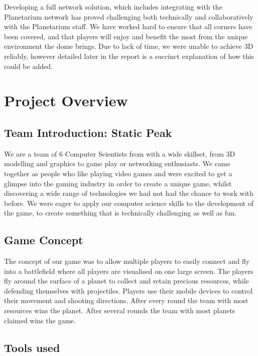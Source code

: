 \documentclass[11pt,a4paper]{article}
\begin{document}
\noindent
 Developing a full network solution, which includes integrating with the Planetarium network has proved challenging both technically and collaboratively with the Planetarium staff. We have worked hard to ensure that all corners have been covered, and that players will enjoy and benefit the most from the unique environment the dome brings. Due to lack of time, we were unable to achieve 3D reliably, however detailed later in the report is a succinct explanation of how this could be added.



\pagebreak







\section{Project Overview}

\subsection{Team Introduction: Static Peak} 
 We are a team of 6 Computer Scientists from with a wide skillset, from 3D modelling and graphics to game play or networking enthusiasts. We came together as people who like playing video games and were excited to get a glimpse into the gaming industry in order to create a unique game, whilst discovering a wide range of technologies we had not had the chance to work with before. We were eager to apply our computer science skills to the development of the game, to create something that is technically challenging as well as fun.

 \subsection{Game Concept}
  The concept of our game was to allow multiple players to easily connect and fly into a battlefield where all players are visualised on one large screen. The players fly around the surface of a planet to collect and retain precious resources, while defending themselves with projectiles. Players use their mobile devices to control their movement and shooting directions. After every round the team with most resources wins the planet. After several rounds the team with most planets claimed wins the game.

 \subsection{Tools used}
\end{document}
